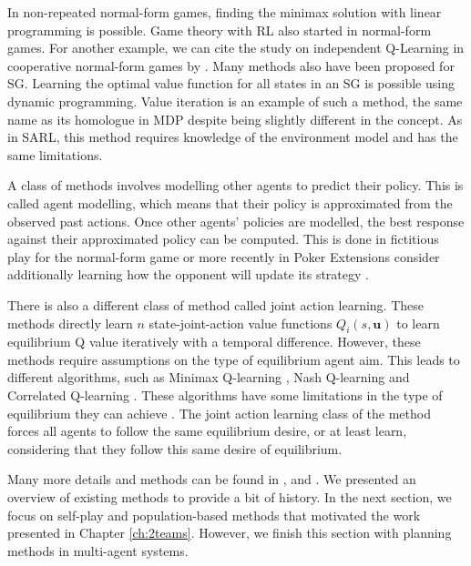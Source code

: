 In non-repeated normal-form games, finding the minimax solution with linear programming \citep{marl-book} is possible.
Game theory with RL also started in normal-form games.
For another example, we can cite the study on independent Q-Learning in cooperative normal-form games by \cite{claus1998dynamics}.
Many methods also have been proposed for SG.
Learning the optimal value function for all states in an SG is possible using dynamic programming.
Value iteration \citep{stochasticGames} is an example of such a method, the same name as its homologue in MDP \citep{sutton2018reinforcement} despite being slightly different in the concept.
As in SARL, this method requires knowledge of the environment model and has the same limitations.

A class of methods involves modelling other agents to predict their policy.
This is called agent modelling, which means that their policy is approximated from the observed past actions.
Once other agents' policies are modelled, the best response against their approximated policy can be computed.
This is done in fictitious play \citep{brown1951iterative} for the normal-form game or more recently in Poker \citep{pmlr-v37-heinrich15} 
Extensions consider additionally learning how the opponent will update its strategy \citep{he2016opponent, foerster2017lola}.

There is also a different class of method called joint action learning.
These methods directly learn $n$ state-joint-action value functions $Q_i(s, \mathbf{u})$ to learn equilibrium Q value iteratively with a temporal difference.
However, these methods require assumptions on the type of equilibrium agent aim.
This leads to different algorithms, such as Minimax Q-learning \citep{MarkovGames}, Nash Q-learning \citep{hu2003nash} and Correlated Q-learning \citep{greenwald2003correlated}.
These algorithms have some limitations in the type of equilibrium they can achieve \citep{marl-book}.
The joint action learning class of the method forces all agents to follow the same equilibrium desire, or at least learn, considering that they follow this same desire of equilibrium.

Many more details and methods can be found in \citep{marl-book}, \citep{Nowe2012GTMARL} and \citep{russel2010}.
We presented an overview of existing methods to provide a bit of history.
In the next section, we focus on self-play and population-based methods that motivated the work presented in Chapter \ref{ch:2teams}.
However, we finish this section with planning methods in multi-agent systems.

